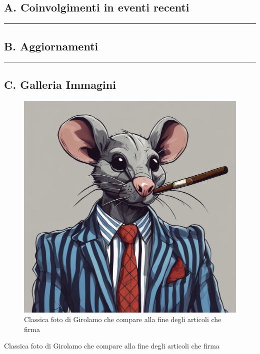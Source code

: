 \subsection{A. Coinvolgimenti in eventi
recenti}\label{a.-coinvolgimenti-in-eventi-recenti}

\begin{center}\rule{0.5\linewidth}{0.5pt}\end{center}

\href{Untitled\%209eb2c6b2c8d14a40a96386c65efaf53b.csv}{}

\subsection{B. Aggiornamenti}\label{b.-aggiornamenti}

\begin{center}\rule{0.5\linewidth}{0.5pt}\end{center}

\href{Untitled\%20599168486376461b8d09a83dbcfd3ceb.csv}{}

\subsection{C. Galleria Immagini}\label{c.-galleria-immagini}

\begin{figure}
\centering
\includegraphics{create-an-image-of-a-human-folk-a-fantasy-race-with-humankind-features-resembling-a-rat-he-has-a-st-2.png}
\caption{Classica foto di Girolamo che compare alla fine degli articoli
che firma}
\end{figure}

Classica foto di Girolamo che compare alla fine degli articoli che firma
